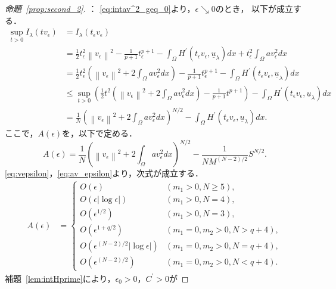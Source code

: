 \begin{proof}[命題~\ref{prop:second_2}]
 ：
 \eqref{eq:intav^2_geq_0}より，$\epsilon \searrow 0$のとき，
 以下が成立する．
 \begin{align*}
  \sup_{t > 0} I_\lambda (t v_\epsilon) & = I_\lambda (t_\epsilon
  v_\epsilon) \\ 
  & = \frac{1}{2} t_\epsilon^2 \left\| v_\epsilon \right\|^2 -
  \frac{1}{p+1} t_\epsilon^{p+1} - \int_\Omega H^\prime(t_\epsilon
  v_\epsilon, \underline{u}_\lambda) dx + t_\epsilon^2
  \int_\Omega a v_\epsilon^2
  dx \\
  & = \frac{1}{2} t_\epsilon^2 \left(
  \left\| v_\epsilon \right\|^2 + 2 \int_\Omega av_\epsilon^2 dx \right) -
  \frac{1}{p+1} t_\epsilon^{p+1} - \int_\Omega H^\prime(t_\epsilon
  v_\epsilon, \underline{u}_\lambda) dx \\
  & \leq \sup_{t > 0} \left( \frac{1}{2} t^2 \left(\left\| v_\epsilon
  \right\|^2 + 2 \int_\Omega av_\epsilon^2 dx \right)
  - \frac{1}{p+1} t^{p+1} \right)
  - \int_\Omega H^\prime(t_\epsilon
  v_\epsilon, \underline{u}_\lambda) dx \\
  & = \frac{1}{N} \left( \left\| v_\epsilon \right\|^2
  + 2 \int_\Omega av_\epsilon^2 dx \right)^{N/2}
  - \int_\Omega H^\prime(t_\epsilon
  v_\epsilon, \underline{u}_\lambda) dx.
 \end{align*}
 ここで，$A(\epsilon)$を，以下で定める．
 \[
  A(\epsilon) = \frac{1}{N}
 \left( \left\| v_\epsilon \right\|^2
 + 2 \int_\Omega av_\epsilon^2 dx \right)^{N/2} - 
 \frac{1}{NM^{(N-2)/2}} S^{N/2}.
 \]
 \eqref{eq:vepsilon}，\eqref{eq:av_epsilon}より，次式が成立する．
 \begin{equation}
  \begin{aligned}
   A(\epsilon) &=
   \begin{cases}
    O(\epsilon) & (m_1 > 0, N \geq 5), \\
    O(\epsilon \lvert \log \epsilon \rvert) & (m_1 > 0, N = 4), \\
    O(\epsilon^{1/2}) & (m_1 > 0, N = 3), \\
    O(\epsilon^{1 + q/2 }) & (m_1 = 0, m_2 > 0,  N > q + 4), \\
    O(\epsilon^{(N-2)/2} \lvert \log \epsilon \rvert) & (m_1 = 0, m_2 > 0,
    N = q + 4), \\
    O(\epsilon^{(N-2)/2}) & (m_1 = 0, m_2 > 0, N < q + 4).
   \end{cases}
  \end{aligned} \label{eq:Aepsilon}
 \end{equation}
 補題~\ref{lem:intHprime}により，$\epsilon_0 > 0$，$C^\prime > 0$が

\end{proof}
